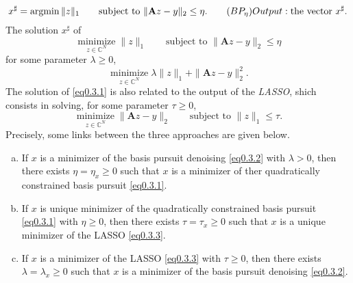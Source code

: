 \begin{mdframed}
    \label{bpd}
    \begin{equation}
        x^{\sharp} = \mathop{\mathrm{argmin}} \|z\|_1 \qquad \text{subject to } \|\mathbf{A}z - y\|_2 \leq \eta. \tag{$BP_{\eta}$}
        Output: \text{the vector } x^{\sharp}.
        \label{eq0.bpn}
    \end{equation}
    The solution $x^{\sharp}$ of 
    \begin{equation}
        \mathop{\mathrm{minimize}}\limits_{z \in \mathbb{C}^{N}}\|z\|_1 \qquad \text{subject to }\|\mathbf{A}z - y\|_2 \leq \eta
        \label{eq0.3.1}
    \end{equation}
    for some parameter $\lambda \geq 0$,
    \begin{equation}
        \mathop{\mathrm{minimize}}\limits_{z \in \mathbb{C}^N} \lambda\|z\|_1 + \|\mathbf{A}z - y\|_2^2.
        \label{eq0.3.2}
    \end{equation}
    The solution of \cref{eq0.3.1} is also related to the output of the \emph{LASSO}, shich consists in solving, for some parameter $\tau \geq 0$,
    \begin{equation}
        \mathop{\mathrm{minimize}}\limits_{z \in \mathbb{C}^N} \|\mathbf{A}z - y\|_2 \qquad \text{subject to }\|z\|_1 \leq \tau.
        \label{eq0.3.3}
    \end{equation}
    Precisely, some links between the three approaches are given below.
\end{mdframed}

\begin{proposition}
    \label{pr0.3.2}
    \begin{enumerate}[(a)]
        \item If $x$ is a minimizer of the basis pursuit denoising \cref{eq0.3.2} with $\lambda > 0$, then there exists $\eta = \eta_x \geq 0$ such that $x$ is a minimizer of ther quadratically constrained basis pursuit \cref{eq0.3.1}.
        \item If $x$ is unique minimizer of the quadratically constrained basis pursuit \cref{eq0.3.1} with $\eta \geq 0$, then there exists $\tau = \tau_x \geq 0$ such that $x$ is a unique minimizer of the LASSO \cref{eq0.3.3}.
        \item If $x$ is a minimizer of the LASSO \cref{eq0.3.3} with $\tau \geq 0$, then there exists $\lambda = \lambda_x \geq 0$ such that $x$ is a minimizer of the basis pursuit denoising \cref{eq0.3.2}.
    \end{enumerate}
\end{proposition}

